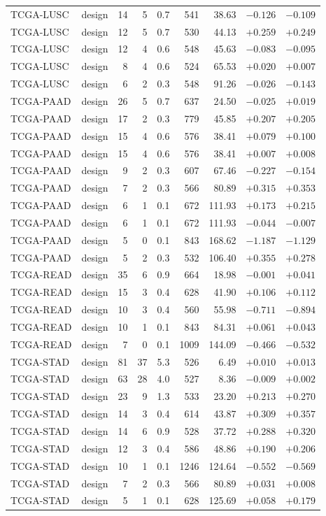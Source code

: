 \begin{longtable}{@{}llrrrrrrr@{}}
TCGA-LUSC & design & 14 & 5 & 0.7 & 541 & 38.63 & $-0.126$ & $-0.109$\\
TCGA-LUSC & design & 12 & 5 & 0.7 & 530 & 44.13 & $+0.259$ & $+0.249$\\
TCGA-LUSC & design & 12 & 4 & 0.6 & 548 & 45.63 & $-0.083$ & $-0.095$\\
TCGA-LUSC & design & 8 & 4 & 0.6 & 524 & 65.53 & $+0.020$ & $+0.007$\\
TCGA-LUSC & design & 6 & 2 & 0.3 & 548 & 91.26 & $-0.026$ & $-0.143$\\
TCGA-PAAD & design & 26 & 5 & 0.7 & 637 & 24.50 & $-0.025$ & $+0.019$\\
TCGA-PAAD & design & 17 & 2 & 0.3 & 779 & 45.85 & $+0.207$ & $+0.205$\\
TCGA-PAAD & design & 15 & 4 & 0.6 & 576 & 38.41 & $+0.079$ & $+0.100$\\
TCGA-PAAD & design & 15 & 4 & 0.6 & 576 & 38.41 & $+0.007$ & $+0.008$\\
TCGA-PAAD & design & 9 & 2 & 0.3 & 607 & 67.46 & $-0.227$ & $-0.154$\\
TCGA-PAAD & design & 7 & 2 & 0.3 & 566 & 80.89 & $+0.315$ & $+0.353$\\
TCGA-PAAD & design & 6 & 1 & 0.1 & 672 & 111.93 & $+0.173$ & $+0.215$\\
TCGA-PAAD & design & 6 & 1 & 0.1 & 672 & 111.93 & $-0.044$ & $-0.007$\\
TCGA-PAAD & design & 5 & 0 & 0.1 & 843 & 168.62 & $-1.187$ & $-1.129$\\
TCGA-PAAD & design & 5 & 2 & 0.3 & 532 & 106.40 & $+0.355$ & $+0.278$\\
TCGA-READ & design & 35 & 6 & 0.9 & 664 & 18.98 & $-0.001$ & $+0.041$\\
TCGA-READ & design & 15 & 3 & 0.4 & 628 & 41.90 & $+0.106$ & $+0.112$\\
TCGA-READ & design & 10 & 3 & 0.4 & 560 & 55.98 & $-0.711$ & $-0.894$\\
TCGA-READ & design & 10 & 1 & 0.1 & 843 & 84.31 & $+0.061$ & $+0.043$\\
TCGA-READ & design & 7 & 0 & 0.1 & 1009 & 144.09 & $-0.466$ & $-0.532$\\
TCGA-STAD & design & 81 & 37 & 5.3 & 526 & 6.49 & $+0.010$ & $+0.013$\\
TCGA-STAD & design & 63 & 28 & 4.0 & 527 & 8.36 & $-0.009$ & $+0.002$\\
TCGA-STAD & design & 23 & 9 & 1.3 & 533 & 23.20 & $+0.213$ & $+0.270$\\
TCGA-STAD & design & 14 & 3 & 0.4 & 614 & 43.87 & $+0.309$ & $+0.357$\\
TCGA-STAD & design & 14 & 6 & 0.9 & 528 & 37.72 & $+0.288$ & $+0.320$\\
TCGA-STAD & design & 12 & 3 & 0.4 & 586 & 48.86 & $+0.190$ & $+0.206$\\
TCGA-STAD & design & 10 & 1 & 0.1 & 1246 & 124.64 & $-0.552$ & $-0.569$\\
TCGA-STAD & design & 7 & 2 & 0.3 & 566 & 80.89 & $+0.031$ & $+0.008$\\
TCGA-STAD & design & 5 & 1 & 0.1 & 628 & 125.69 & $+0.058$ & $+0.179$\\
\bottomrule
\end{longtable}
